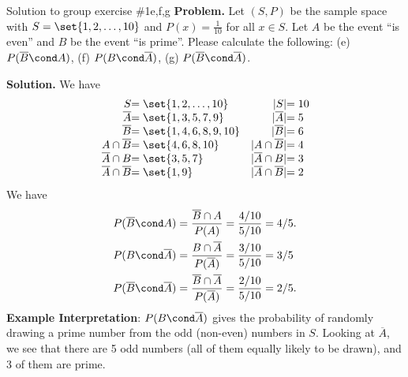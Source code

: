 \documentclass[10pt]{beamer}
\begin{document}
\begin{frame}{Solution to group exercise \#1e,f,g}
\footnotesize 
\textbf{Problem.}  Let $(S,P)$ be the sample space with $S=\set{1,2,\hdots, 10}$ and $P(x) =\frac{1}{10}$ for all $x \in S$.  Let $A$ be the event \enquote{is even} and $B$ be the event \enquote{is prime}.  Please calculate the following: (e) $P(\overline{B} \cond A)$, (f) $P(B \cond \overline{A})$, (g) $P(\overline{B} \cond \overline{A})$.
		
\vfill 

\textbf{Solution.}
We have 
\[
\begin{array}{r@{}l r@{}l}
S &= \set{1,2,\hdots, 10} & |S| &= 10 \\
\overline{A} &= \set{1,3,5,7,9} & |\overline{A}| &= 5 \\
\overline{B} &= \set{1,4,6,8,9,10} & |\overline{B}| &= 6 \\
A \cap \overline{B} &= \set{4,6,8,10} & |A \cap \overline{B}| &= 4 \\
\overline{A} \cap B &= \set{3,5,7} & |\overline{A} \cap B | &= 3 \\
\overline{A} \cap \overline{B} &= \set{1,9} & |\overline{A} \cap  \overline{B} | &= 2
\end{array}
\]
%
We have 
%
\begin{align*}
P(\overline{B} \cond A) &= \frac{\overline{B} \cap A}{P(A)} = \frac{4/10}{5/10} = 4/5. \\
P(B \cond \overline{A}) &= \frac{B \cap \overline{A}}{P(\overline{A})} = \frac{3/10}{5/10} = 3/5 \\
P(\overline{B} \cond \overline{A}) &= \frac{\overline{B} \cap \overline{A}}{P(\overline{A})} = \frac{2/10}{5/10} = 2/5.
\end{align*}
%
\vfill 
\textbf{Example Interpretation}: $P(B \cond \overline{A})$ gives the probability of randomly drawing a prime number from the odd (non-even) numbers in $S$.  Looking at $\overline{A}$, we see that there are 5 odd numbers (all of them equally likely to be drawn), and 3 of them are prime.
\end{frame}
\end{document}
